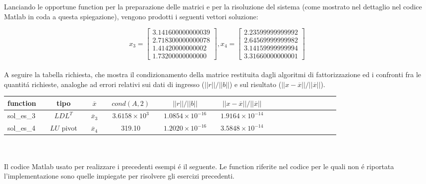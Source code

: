 \noindent Lanciando le opportune function per la preparazione delle matrici e per la risoluzione del sistema (come mostrato nel dettaglio nel codice Matlab in coda a questa spiegazione), vengono prodotti i seguenti vettori soluzione:

\[
x_3 = \begin{bmatrix} 3.141600000000039 \\ 2.718300000000078 \\ 1.41420000000002 \\ 1.73200000000000 \end{bmatrix},
x_4 = \begin{bmatrix} 2.23599999999992 \\ 2.64569999999982 \\ 3.14159999999994 \\ 3.31660000000001 \end{bmatrix}
\]
\\
\noindent A seguire la tabella richiesta, che mostra il condizionamento della matrice restituita dagli algoritmi di fattorizzazione ed i confronti fra le quantit\'a richieste, analoghe ad errori relativi sui dati di ingresso (\(||r||/||b||\)) e sul risultato (\(||x-\overline{x}||/||\overline{x}||\)).
\\

\noindent\begin{tabular}{l*{20}{c}}
function & \vline& tipo & \vline& \(\overline{x}\) & \vline& \(cond(A, 2)\) & \vline& \(||r||/||b||\) & \vline& \(||x-\overline{x}||/||\overline{x}||\) \\
\hline
sol\_es\_3 & \vline& \(LDL^T\)    & \vline& \(\overline{x}_3\) & \vline& \(3.6158 \times 10^3\)    & \vline& \(1.0854 \times 10^{-16}\)	& \vline& \(1.9164 \times 10^{-14}\)   \\
sol\_es\_4 & \vline& \(LU\) pivot & \vline& \(\overline{x}_4\) & \vline& 319.10                    & \vline& \(1.2020 \times 10^{-16}\)	& \vline& \(3.5848 \times 10^{-14}\) 	 \\

\end{tabular}
\\
\\

\noindent Il codice Matlab usato per realizzare i precedenti esempi \'e il seguente. Le function riferite nel codice per le quali non \'e riportata l'implementazione sono quelle impiegate per risolvere gli esercizi precedenti.

